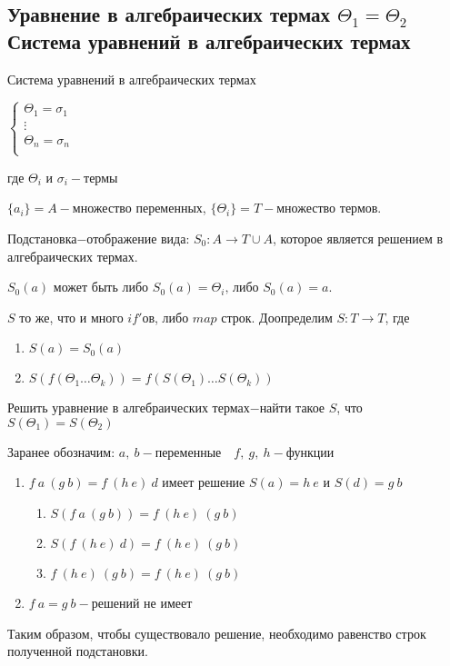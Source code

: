 	\subsection{Уравнение в алгебраических термах $\Theta_1=\Theta_2$\\Система уравнений в алгебраических термах}
	\begin{definition}Система уравнений в алгебраических термах\end{definition}
	$
		\begin{cases}
			\Theta_1=\sigma_1&\\
			\vdots&\\
			\Theta_n=\sigma_n&\\
		\end{cases}
	$\par где $\Theta_i \text{ и } \sigma_i-\text{термы}$\par
	\begin{definition}$\{a_i\}=A-$множество переменных, $\{\Theta_i\}=T-$множество термов.\end{definition}
	\begin{definition}Подстановка$-$отображение вида: $S_0:A\to T\cup A$, которое является решением в алгебраических термах.\par $S_0(a)$ может быть либо $S_0(a)=\Theta_i\text{, либо }S_0(a)=a$.\end{definition} 
	$S$ то же, что и много $if'$ов, либо $map$ строк. Доопределим $S:T\to T$, где \begin{enumerate}
		\item $S(a)=S_0(a)$
		\item $S(f(\Theta_1 \ldots \Theta_k))=f(S(\Theta_1) \ldots S(\Theta_k))$
	\end{enumerate}
	
	\begin{definition}Решить уравнение в алгебраических термах$-$найти такое $S$, что $S(\Theta_1)=S(\Theta_2)$\end{definition} 

	\begin{example}\end{example}
		Заранее обозначим: $a,\:b-\text{переменные}\hspace{1em} f,\:g,\:h-\text{функции}$
		\begin{enumerate}
			\item $f\:a\:(g\:b)=f\:(h\:e)\:d$ имеет решение $S(a)=h\:e\text{ и }S(d)=g\:b$
				\begin{enumerate}
					\item $S(f\:a\:(g\:b))=f\:(h\:e)\:(g\:b)$
					\item $S(f\:(h\:e)\:d)=f\:(h\:e)\:(g\:b)$
					\item $f\:(h\:e)\:(g\:b)=f\:(h\:e)\:(g\:b)$
				\end{enumerate}
			\item $f\:a=g\:b-$решений не имеет
		\end{enumerate}
		Таким образом, чтобы существовало решение, необходимо равенство строк полученной подстановки.\par
